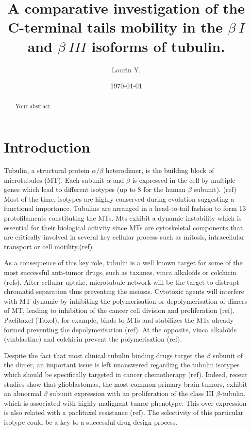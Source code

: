 \documentclass[a4paper]{article}
\title{A comparative investigation of the C-terminal tails mobility in the $\beta~I$
and $\beta~III$ isoforms of tubulin.}
\author{Laurin Y.}
\date{\today}
\begin{document}
\maketitle

\begin{abstract}
Your abstract.
\end{abstract}

\section{Introduction}

Tubulin, a structural protein $\alpha/\beta$ heterodimer, is the building block of
microtubules (MT). Each subunit $\alpha$ and $\beta$ is expressed in the cell by multiple
genes which lead to different isotypes (up to 8 for the human $\beta$ subunit). (ref)
Most of the time, isotypes are highly conserved during evolution suggesting a functional
importance. Tubulins are arranged in a head-to-tail fashion to form 13 protofilaments
constituting the MTs. Mts exhibit a dynamic instability which is essential for their
biological activity since MTs are cytoskeletal components that are critically involved
in several key cellular process such as mitosis, intracellular transport or cell motility.(ref)

As a consequence of this key role, tubulin is a well known target for some of the
most successful anti-tumor drugs, such as taxanes, vinca alkaloïds or colchicin (refs).
After cellular uptake, microtubule network will be the target to distrupt chromatid
separation thus preventing the meiosis. Cytotoxic agents will interfere with MT
dynamic by inhibiting the polymerisation or depolymerisation of dimers of MT, leading
to inhibition of the cancer cell division and proliferation (ref). Paclitaxel (Taxol), for
example, binds to MTs and stabilizes the MTs already formed preventing the depolymerisation (ref).
At the opposite, vinca alkaloïds (vinblastine) and colchicin prevent the polymerisation (ref).

Despite the fact that most clinical tubulin binding drugs target the $\beta$ subunit
of the dimer, an important issue is left unanswered regarding the tubulin
isotypes which should be specifically targeted in cancer chemotherapy (ref). Indeed,
recent studies show that glioblastomas, the most common primary brain tumors, exhibit
an abnormal $\beta$ subunit expression with an proliferation of the class III $\beta$-tubulin,
which is associated with highly malignant tumor phenotype. This over expression is also
related with a paclitaxel resistance (ref). The selectivity of this particular isotype could be
a key to a successful drug design process.
\end{document}
